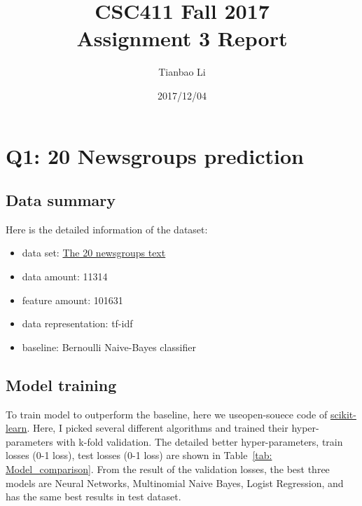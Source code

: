 \documentclass[a4paper]{article}
\title{CSC411 Fall 2017\\Assignment 3 Report}
\author{Tianbao Li}
\date{2017/12/04}
\begin{document}
\maketitle

\section{Q1: 20 Newsgroups prediction}

\subsection{Data summary}

Here is the detailed information of the dataset:

\begin{itemize}
    \item data set: \href{http://scikit-learn.org/stable/datasets/twenty_newsgroups.html}{The 20 newsgroups text}
    \item data amount: 11314
    \item feature amount: 101631
    \item data representation: tf-idf
    \item baseline: Bernoulli Naive-Bayes classifier
\end{itemize}

\subsection{Model training}

To train model to outperform the baseline, here we useopen-souece code of \href{http://scikit-learn.org/stable/}{scikit-learn}. Here, I picked several different algorithms and trained their hyper-parameters with k-fold validation. The detailed better hyper-parameters, train losses (0-1 loss), test losses (0-1 loss) are shown in Table~\ref{tab: Model_comparison}. From the result of the validation losses, the best three models are Neural Networks, Multinomial Naive Bayes, Logist Regression, and has the same best results in test dataset.
\end{document}
